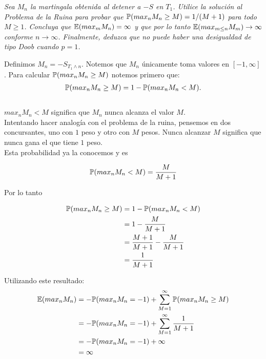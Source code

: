 \emph{
	Sea $M_n$ la martingala obtenida al detener a $-S$ en $T_1$. Utilice la solución al
	Problema de la Ruina para probar que $\mathbb{P}(max_n M_n \geq M) = 1/(M+1)$ para todo $M \geq 1$. Concluya que
	$\mathbb{E}(max_m M_n) = \infty$ y que por lo tanto $\mathbb{E}(max_{m\leq n} M_m) \rightarrow \infty$ conforme 
	$n \rightarrow \infty$. Finalmente, deduzca que no puede haber una desigualdad de tipo Doob cuando $p=1$.\\
}	

	Definimos $M_n = -S_{T_1 \wedge n}$. Notemos que $M_n$ únicamente toma valores en $[-1, \infty]$.
	Para calcular $\mathbb{P}(max_n M_n \geq M)$ notemos primero que:
	\begin{align}
		\mathbb{P}(max_n M_n \geq M) = 1 - \mathbb{P}(max_n M_n < M).
	\end{align}\\
	
	$max_n M_n < M$ significa que $M_n$ nunca alcanza el valor $M$.\\
	 
	Intentando hacer analogía con el problema de la ruina, pensemos en dos concursantes,
	uno con $1$ peso y otro con $M$ pesos. Nunca alcanzar $M$ significa que nunca gana el que tiene $1$ peso.\\
	
	Esta probabilidad ya la conocemos y es 
	
	\begin{align*}
		\mathbb{P}(max_n M_n < M) = \frac{M}{M + 1}
	\end{align*}
		
	Por lo tanto
	
	\begin{align}
		\mathbb{P}(max_n M_n \geq M) 	&= 1 - \mathbb{P}(max_n M_n < M) \\
								&= 1 - \frac{M}{M + 1}\\
								&= \frac{M+1}{M+1} - \frac{M}{M + 1}\\
								&= \frac{1}{M+1}
	\end{align}
	
	Utilizando este resultado:
	\begin{align} \label{problema1_3:esperanza_del_maximo_de_M_n}
		\mathbb{E}(max_n M_n) 	&= - \mathbb{P}(max_n M_n = -1) + \sum_{M=1}^{\infty} \mathbb{P}(max_n M_n \geq M) \\
						&= - \mathbb{P}(max_n M_n = -1) + \sum_{M=1}^{\infty} \frac{1}{M+1} \\ 
						&= - \mathbb{P}(max_n M_n = -1) + \infty \\
						&= \infty
	\end{align}						
	
